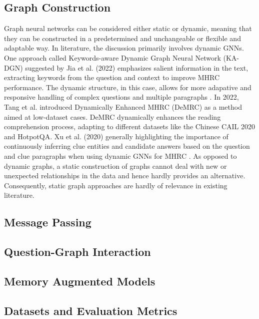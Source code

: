 \documentclass[sigplan,screen]{acmart}
\begin{document}
\subsection{Graph Construction}
Graph neural networks can be considered either static or dynamic, meaning that they can be constructed in a predetermined and unchangeable or flexible 
and adaptable way. In literature, the discussion primarily involves dynamic GNNs. One approach called Keywords-aware Dynamic Graph Neural Network (KA-DGN)
suggested by Jia et al. (2022) \cite{RN171b} emphasizes salient information in the text, extracting keywords from the question and context to improve MHRC performance.
The dynamic structure, in this case, allows for more adapative and responsive handling of complex questions and multiple paragraphs \cite{RN171b}. In 2022, 
Tang et al. \cite{RN172} introduced Dynamically Enhanced MHRC (DeMRC) as a method aimed at low-dataset cases. DeMRC dynamically enhances the reading comprehension process,
adapting to different datasets like the Chinese CAIL 2020 and HotpotQA. Xu et al. (2020) generally highlighting the importance of continuously inferring
clue entities and candidate answers based on the question and clue paragraphs when using dynamic GNNs for MHRC \cite{RN173}. 
As opposed to dynamic graphs, a static construction of graphs cannot deal with new or unexpected relationships in the data and hence hardly
provides an alternative. Consequently, static graph approaches are hardly of relevance in existing literature. 

\subsection{Message Passing}


\subsection{Question-Graph Interaction}

\subsection{Memory Augmented Models}

\subsection{Datasets and Evaluation Metrics}
\end{document}
